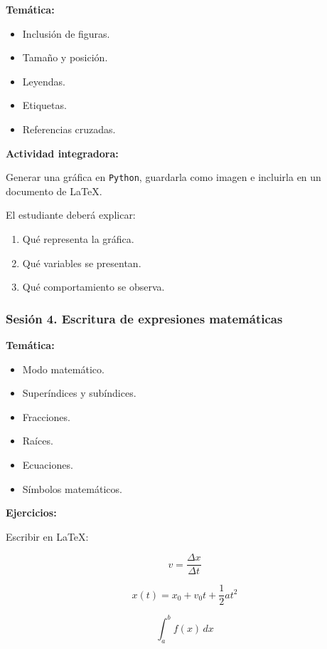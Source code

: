 \documentclass[12pt,letterpaper]{article}
\newcommand{\python}{\texttt{Python}}
\newcommand{\latexname}{\LaTeX}
\begin{document}
\textbf{Temática:}
\begin{itemize}[noitemsep]
    \item Inclusión de figuras.
    \item Tamaño y posición.
    \item Leyendas.
    \item Etiquetas.
    \item Referencias cruzadas.
\end{itemize}

\textbf{Actividad integradora:}

Generar una gráfica en \python, guardarla como imagen e incluirla en un
documento de \latexname.

El estudiante deberá explicar:

\begin{enumerate}
    \item Qué representa la gráfica.
    \item Qué variables se presentan.
    \item Qué comportamiento se observa.
\end{enumerate}
\subsubsection*{Sesión 4. Escritura de expresiones matemáticas}

\textbf{Temática:}
\begin{itemize} [noitemsep]
    \item Modo matemático.
    \item Superíndices y subíndices.
    \item Fracciones.
    \item Raíces.
    \item Ecuaciones.
    \item Símbolos matemáticos.
\end{itemize}

\textbf{Ejercicios:}

Escribir en \latexname:

\begin{equation}
v = \frac{\Delta x}{\Delta t}
\end{equation}

\begin{equation}
x(t)=x_0+v_0t+\frac{1}{2}at^2
\end{equation}

\begin{equation}
\int_a^b f(x)\,dx
\end{equation}
\end{document}

